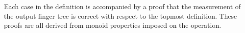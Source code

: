 \documentclass[12pt,twoside,notitlepage]{report}
\begin{document}
\begin{code}
\\
\\
\\
\\
\\
\> \AgdaSymbol{:}  \AgdaSymbol{\{}\AgdaSymbol{\}} \AgdaSymbol{\{} \AgdaSymbol{:}  \AgdaSymbol{\}} \AgdaSymbol{\{} \AgdaSymbol{:}  \AgdaSymbol{\}}\<%
\\
\>[2]\<[6]%
\>[6]  \AgdaSymbol{:}   \<%
\\
\>[2]\<[6]%
\>[6]  \AgdaSymbol{:}    \<%
\\
\>[2]\<[6]%
\>[6]\AgdaSymbol{\{} \AgdaSymbol{:} \AgdaSymbol{\}}\<%
\\
\>[2]\<[6]%
\>[6] \AgdaSymbol{(} \AgdaSymbol{:} \AgdaSymbol{)}\<%
\\
\>[2]\<[6]%
\>[6]          \AgdaSymbol{\{}\AgdaSymbol{\}}\<%
\\
\>[2]\<[6]%
\>[6]          \AgdaSymbol{\{}    \AgdaSymbol{\}}\<%
\\
\end{code}
Each case in the definition is accompanied by a proof that the measurement of the output finger tree is correct with respect to the topmost definition. These proofs are all derived from monoid properties imposed on the operation.
\end{document}
